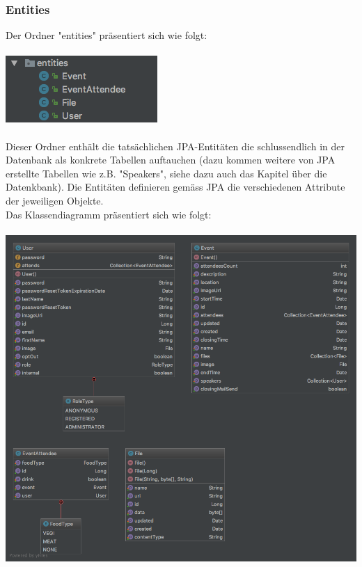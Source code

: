 \documentclass[11pt]{article} %
\begin{document}
\subsubsection{Entities}
Der Ordner "entities" präsentiert sich wie folgt:
\\
\\
\includegraphics[scale=0.7]{structure_eventmanagement_entities}
\\
\\
Dieser Ordner enthält die tatsächlichen JPA-Entitäten die schlussendlich in der Datenbank als konkrete Tabellen auftauchen (dazu kommen weitere von JPA erstellte Tabellen wie z.B. "Speakers", siehe dazu auch das Kapitel über die Datenkbank). Die Entitäten definieren gemäss JPA die verschiedenen Attribute der jeweiligen Objekte.
\\
Das Klassendiagramm präsentiert sich wie folgt:
\\
\\
\includegraphics[width=1.0\textwidth]{class-diagrams/Eventmanagement-Entities}
\\
\\
\end{document}
